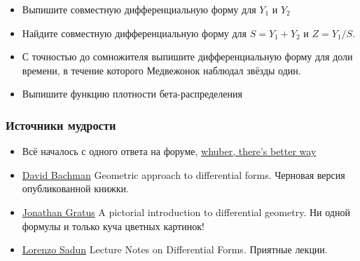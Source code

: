 \documentclass[11pt,russian,]{article}
\providecommand{\tightlist}{%
  \setlength{\itemsep}{0pt}\setlength{\parskip}{0pt}}
\begin{document}
\begin{itemize}
\tightlist
\item
  Выпишите совместную дифференциальную форму для \(Y_1\) и \(Y_2\)
\item
  Найдите совместную дифференциальную форму для \(S=Y_1 + Y_2\) и
  \(Z=Y_1/S\).
\item
  С точностью до сомножителя выпишите дифференциальную форму для доли
  времени, в течение которого Медвежонок наблюдал звёзды один.
\item
  Выпишите функцию плотности бета-распределения
\end{itemize}

\subsubsection{Источники мудрости}\label{-}

\begin{itemize}
\tightlist
\item
  Всё началось с одного ответа на форуме,
  \href{https://stats.stackexchange.com/questions/36093}{whuber, there's
  better way}
\item
  \href{https://arxiv.org/abs/math/0306194v1}{David Bachman} Geometric
  approach to differential forms. Черновая версия опубликованной книжки.
\item
  \href{https://arxiv.org/abs/1709.08492}{Jonathan Gratus} A pictorial
  introduction to differential geometry. Ни одной формулы и только куча
  цветных картинок!
\item
  \href{https://arxiv.org/abs/1604.07862}{Lorenzo Sadun} Lecture Notes
  on Differential Forms. Приятные лекции.
\end{itemize}

\printbibliography
\end{document}
